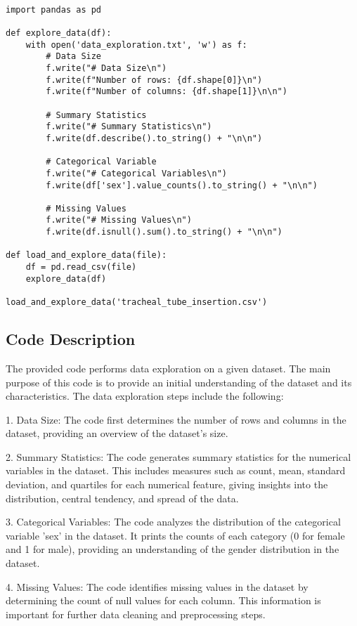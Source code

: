 \documentclass[11pt]{article}
\begin{document}
\begin{verbatim}

import pandas as pd

def explore_data(df):
    with open('data_exploration.txt', 'w') as f:
        # Data Size
        f.write("# Data Size\n")
        f.write(f"Number of rows: {df.shape[0]}\n")
        f.write(f"Number of columns: {df.shape[1]}\n\n")

        # Summary Statistics
        f.write("# Summary Statistics\n")
        f.write(df.describe().to_string() + "\n\n")

        # Categorical Variable
        f.write("# Categorical Variables\n")
        f.write(df['sex'].value_counts().to_string() + "\n\n")

        # Missing Values
        f.write("# Missing Values\n")
        f.write(df.isnull().sum().to_string() + "\n\n")

def load_and_explore_data(file):
    df = pd.read_csv(file)
    explore_data(df)

load_and_explore_data('tracheal_tube_insertion.csv')

\end{verbatim}

\subsection{Code Description}

The provided code performs data exploration on a given dataset. The main purpose of this code is to provide an initial understanding of the dataset and its characteristics. The data exploration steps include the following:

1. Data Size: The code first determines the number of rows and columns in the dataset, providing an overview of the dataset's size.

2. Summary Statistics: The code generates summary statistics for the numerical variables in the dataset. This includes measures such as count, mean, standard deviation, and quartiles for each numerical feature, giving insights into the distribution, central tendency, and spread of the data.

3. Categorical Variables: The code analyzes the distribution of the categorical variable 'sex' in the dataset. It prints the counts of each category (0 for female and 1 for male), providing an understanding of the gender distribution in the dataset.

4. Missing Values: The code identifies missing values in the dataset by determining the count of null values for each column. This information is important for further data cleaning and preprocessing steps.
\end{document}
